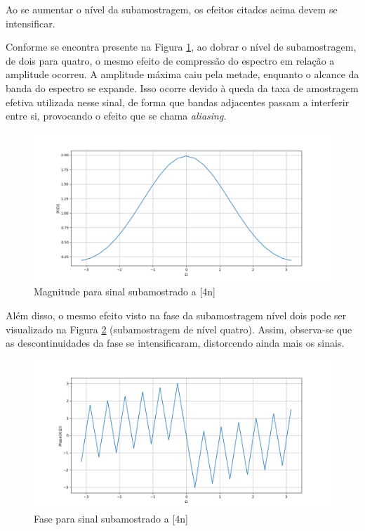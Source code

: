 Ao se aumentar o nível da subamostragem, os efeitos citados acima devem se intensificar. 

Conforme se encontra presente na Figura \ref{fig:graph_13}, ao dobrar o nível de subamostragem, de dois para quatro, o mesmo efeito de compressão do espectro em relação a amplitude ocorreu. A amplitude máxima caiu pela metade, enquanto o alcance da banda do espectro se expande. Isso ocorre devido à queda da taxa de amostragem efetiva utilizada nesse sinal, de forma que bandas adjacentes passam a interferir entre si, provocando o efeito que se chama \textit{aliasing}.

\begin{figure}[!htb]
    \centering
    \includegraphics[width=\linewidth]{Imagens/fig13.png}
    \caption{Magnitude para sinal subamostrado a [4n]}
    \label{fig:graph_13}
\end{figure}

Além disso, o mesmo efeito visto na fase da subamostragem nível dois pode ser visualizado na Figura \ref{fig:graph_14} (subamostragem de nível quatro). Assim, observa-se que as descontinuidades da fase se intensificaram, distorcendo ainda mais os sinais.

\begin{figure}[!htb]
    \centering
    \includegraphics[width=\linewidth]{Imagens/fig14.png}
    \caption{Fase para sinal subamostrado a [4n]}
    \label{fig:graph_14}
\end{figure}

